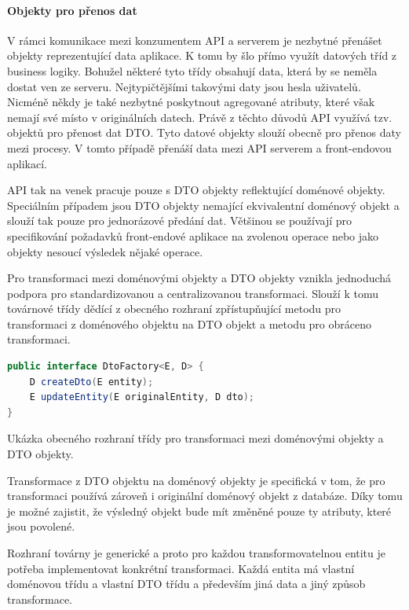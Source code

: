 \begin{itemize}
\begin{itemize}
			\paragraph{Objekty pro přenos dat}

			V rámci komunikace mezi konzumentem \ac{API} a serverem je nezbytné přenášet objekty reprezentující data
			aplikace.
			K tomu by šlo přímo využít datových tříd z business logiky.
			Bohužel některé tyto třídy obsahují data, která by se neměla dostat ven ze serveru.
			Nejtypičtějšími takovými daty jsou hesla uživatelů.
			Nicméně někdy je také nezbytné poskytnout agregované atributy, které však nemají své místo v originálních datech.
			Právě z těchto důvodů \ac{API} využívá tzv. objektů pro přenost dat \ac{DTO}.
			Tyto datové objekty slouží obecně pro přenos daty mezi procesy.
			V tomto případě přenáší data mezi \ac{API} serverem a front-endovou aplikací.

			\ac{API} tak na venek pracuje pouze s \ac{DTO} objekty reflektující doménové objekty.
			Speciálním případem jsou \ac{DTO} objekty nemající ekvivalentní doménový objekt a slouží tak pouze pro jednorázové
			předání dat.
			Většinou se používají pro specifikování požadavků front-endové aplikace na zvolenou operace nebo jako
			objekty nesoucí výsledek nějaké operace.

			Pro transformaci mezi doménovými objekty a \ac{DTO} objekty vznikla jednoduchá podpora pro standardizovanou
			a centralizovanou transformaci.
			Slouží k tomu továrnové třídy dědící z obecného rozhraní zpřístupňující metodu pro transformaci z doménového
			objektu na \ac{DTO} objekt a metodu pro obráceno transformaci.

			\begin{lstlisting}[language=Java]
public interface DtoFactory<E, D> {
    D createDto(E entity);
    E updateEntity(E originalEntity, D dto);
}
			\end{lstlisting}
			Ukázka obecného rozhraní třídy pro transformaci mezi doménovými objekty a DTO objekty. %

			Transformace z \ac{DTO} objektu na doménový objekty je specifická v tom, že pro transformaci používá zároveň
			i originální doménový objekt z databáze.
			Díky tomu je možné zajistit, že výsledný objekt bude mít změněné pouze ty atributy, které jsou povolené.

			Rozhraní továrny je generické a proto pro každou transformovatelnou entitu je potřeba implementovat konkrétní
			transformaci.
			Každá entita má vlastní doménovou třídu a vlastní \ac{DTO} třídu a především jiná data a jiný způsob transformace.


\end{itemize}
\end{itemize}
